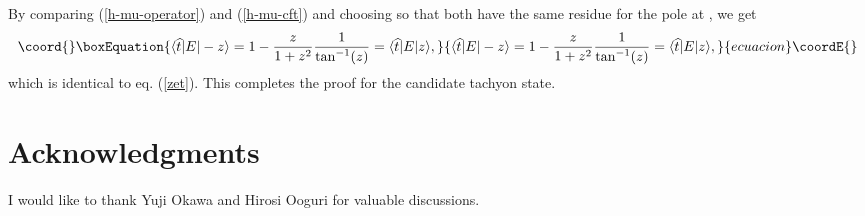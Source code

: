 \documentclass[a4paper,12pt]{article}
\begin{document}
By comparing (\ref{h-mu-operator}) and (\ref{h-mu-cft}) and
choosing \coordHE{} so that both have the same residue for the pole at \coordHE{},
we get
\begin{equation}\coord{}\boxEquation{
\langle \widehat{t}|E|-z\rangle
=1-\frac{z}{1+z^2}\frac{1}{\tan^{-1}(z)}
=\langle \widehat{t}|E|z\rangle
,
}{
\langle \widehat{t}|E|-z\rangle
=1-\frac{z}{1+z^2}\frac{1}{\tan^{-1}(z)}
=\langle \widehat{t}|E|z\rangle
,
}{ecuacion}\coordE{}\end{equation}
which is identical to eq. (\ref{zet}). This completes the proof
for the candidate tachyon state.
\section*{Acknowledgments}
I would like to thank Yuji Okawa and Hirosi Ooguri for
valuable discussions.
\newpage


\renewcommand{\baselinestretch}{0.87}
\end{document}
